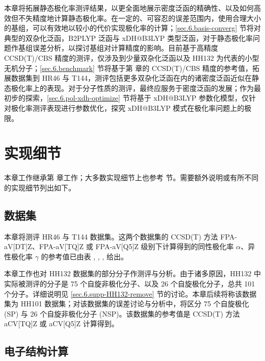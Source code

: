 本章将拓展静态极化率测评结果，以更全面地展示密度泛函的精确性、以及如何高效但不失精度地计算静态极化率。在一定的、可容忍的误差范围内，使用合理大小的基组，可以有效地以较小的代价实现极化率的计算；\ref{sec.6.basis-converg} 节将对典型的双杂化泛函，B2PLYP 泛函与 xDH@B3LYP 类型泛函，对于静态极化率问题作基组误差分析，以探讨基组对计算精度的影响。目前基于高精度 CCSD(T)/CBS 精度的测评，仅涉及到少量双杂化泛函以及 HH132\cite{Hait-Head-Gordon.PCCP.2018} 为代表的小型无机分子；\ref{sec.6.benchmark} 节将基于第  章的 CCSD(T)/CBS 精度的参考值，拓展数据集到 HR46\cite{Hickey-Rowley.JPCA.2014} 与 T144\cite{Wu-Thakkar.CPL.2015}，测评包括更多双杂化泛函在内的诸密度泛函近似在静态极化率上的表现。对于分子性质的测评，最终应服务于密度泛函的发展；作为最初步的探索，\ref{sec.6.pol-xdh-optimize} 节将基于 xDH@B3LYP 参数化模型\cite{Zhang-Xu.JPCL.2021}，仅针对极化率测评表现进行参数优化，探究 xDH@B3LYP 模式在极化率问题上的极限。

\section{实现细节}

本章工作继承第  章工作；大多数实现细节上也参考  节。需要额外说明或有所不同的实现细节列出如下。

\subsection{数据集}

本章将测评 HR46\cite{Hickey-Rowley.JPCA.2014} 与 T144\cite{Wu-Thakkar.CPL.2015} 数据集。这两个数据集的 CCSD(T) 方法 FPA-aV[DT]Z、FPA-aV[TQ]Z 或 FPA-aV[Q5]Z 级别下计算得到的同性极化率 $\alpha$、异性极化率 $\gamma$ 的参考值已由表 , , ,  给出。

本章工作也对 HH132 数据集\cite{Hait-Head-Gordon.PCCP.2018}的部分分子作测评与分析。由于诸多原因，HH132 中实际被测评的分子是 75 个自旋非极化分子、以及 26 个自旋极化分子，总共 101 个分子。详细说明见 \ref{sec.6.supp-HH132-remove} 节的讨论。本章后续将称该数据集为 HH101 数据集；对该数据集的误差讨论与分析中，将区分 75 个自旋极化 (SP) 与 26 个自旋非极化分子 (NSP)。该数据集的参考值是 CCSD(T) 方法 aCV[TQ]Z 或 aCV[Q5]Z 计算得到。

\subsection{电子结构计算}

